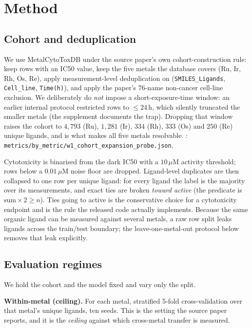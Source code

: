 \section{Method}
\label{sec:method}

\subsection{Cohort and deduplication}
\label{sec:method:cohort}

We use MetalCytoToxDB \citep{krasnov2026metalcytotoxdb} under the source paper's
own cohort-construction rule: keep rows with an IC50 value, keep the five metals
the database covers (Ru, Ir, Rh, Os, Re), apply measurement-level deduplication
on (\texttt{SMILES\_Ligands}, \texttt{Cell\_line}, \texttt{Time(h)}), and apply
the paper's 76-name non-cancer cell-line exclusion. We deliberately do
\emph{not} impose a short-exposure-time window: an earlier internal protocol
restricted rows to $\leq24$\,h, which silently truncated the smaller metals
(the supplement documents the trap). Dropping that window raises the cohort to
$4{,}793$ (Ru), $1{,}281$ (Ir), $334$ (Rh), $333$ (Os) and $250$ (Re) unique
ligands, and is what makes all five metals resolvable. \MEASURED:
\texttt{metrics/by\_metric/w1\_cohort\_expansion\_probe.json}.

Cytotoxicity is binarised from the dark IC50 with a $10\,\mu$M activity
threshold; rows below a $0.01\,\mu$M noise floor are dropped. Ligand-level
duplicates are then collapsed to one row per unique ligand: for every ligand the
label is the majority over its measurements, and exact ties are broken
\emph{toward active} (the predicate is $\text{sum}\times 2 \geq n$). Ties going
to active is the conservative choice for a cytotoxicity endpoint and is the rule
the released code actually implements. Because the same organic ligand can be
measured against several metals, a raw row split leaks ligands across the
train/test boundary; the leave-one-metal-out protocol below removes that leak
explicitly.

\subsection{Evaluation regimes}
\label{sec:method:regimes}

We hold the cohort and the model fixed and vary only the split.

\textbf{Within-metal (ceiling).} For each metal, stratified 5-fold
cross-validation over that metal's unique ligands, ten seeds. This is the
setting the source paper reports, and it is the \emph{ceiling} against which
cross-metal transfer is measured.

